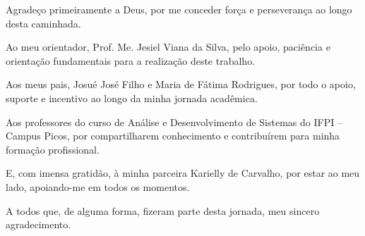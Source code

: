 \begin{agradecimentos}
  Agradeço primeiramente a Deus, por me conceder força e perseverança ao longo desta caminhada.
  
  Ao meu orientador, Prof. Me. Jesiel Viana da Silva, pelo apoio, paciência e orientação fundamentais para a realização deste trabalho.
  
  Aos meus pais, Josué José Filho e Maria de Fátima Rodrigues, por todo o apoio, suporte e incentivo ao longo da minha jornada acadêmica.
  
  Aos professores do curso de Análise e Desenvolvimento de Sistemas do IFPI – Campus Picos, por compartilharem conhecimento e contribuírem para minha formação profissional.
  
  E, com imensa gratidão, à minha parceira Karielly de Carvalho, por estar ao meu lado, apoiando-me em todos os momentos.
  
  A todos que, de alguma forma, fizeram parte desta jornada, meu sincero agradecimento.
  \end{agradecimentos}